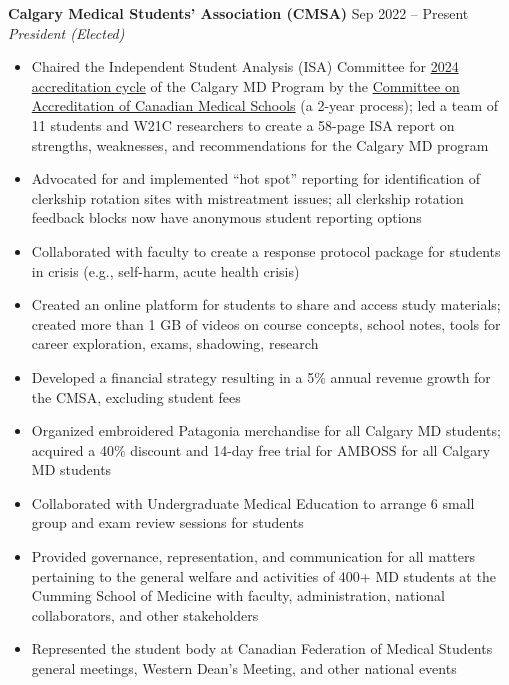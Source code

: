 \documentclass{article}
\begin{document}
\textbf{Calgary Medical Students' Association (CMSA)} \hfill Sep 2022 -- Present \\
\textit{President (Elected)}
\begin{itemize}
    \item Chaired the Independent Student Analysis (ISA) Committee for \href{https://cumming.ucalgary.ca/about/ume-accreditation}{2024 accreditation cycle} of the Calgary MD Program by the \href{https://cacms-cafmc.ca/}{Committee on Accreditation of Canadian Medical Schools} (a 2-year process); led a team of 11 students and W21C researchers to create a 58-page ISA report on strengths, weaknesses, and recommendations for the Calgary MD program
    \item Advocated for and implemented ``hot spot'' reporting for identification of clerkship rotation sites with mistreatment issues; all clerkship rotation feedback blocks now have anonymous student reporting options
    \item Collaborated with faculty to create a response protocol package for students in crisis (e.g., self-harm, acute health crisis)
    \item Created an online platform for students to share and access study materials; created more than 1 GB of videos on course concepts, school notes, tools for career exploration, exams, shadowing, research
    \item Developed a financial strategy resulting in a 5\% annual revenue growth for the CMSA, excluding student fees
    \item Organized embroidered Patagonia merchandise for all Calgary MD students; acquired a 40\% discount and 14-day free trial for AMBOSS for all Calgary MD students
    \item Collaborated with Undergraduate Medical Education to arrange 6 small group and exam review sessions for students
    \item Provided  governance, representation, and communication for all matters pertaining to the general welfare and activities of 400+ MD students at the Cumming School of Medicine with faculty, administration, national collaborators, and other stakeholders
    \item Represented the student body at Canadian Federation of Medical Students general meetings, Western Dean's Meeting, and other national events
\end{itemize} \vspace{1em}
\end{document}
